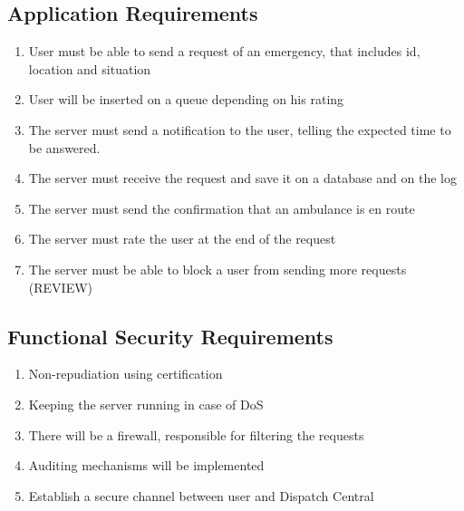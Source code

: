 \documentclass[a4paper,titlepage,11pt]{article}
\begin{document}
	\subsection{Application Requirements}
		\begin{enumerate}
			\item User must be able to send a request of an emergency, that includes id, location and situation

			\item User will be inserted on a queue depending on his rating
			
			\item The server must send a notification to the user, telling the expected time to be answered. 

			\item The server must receive the request and save it on a database and on the log

			\item The server must send the confirmation that an ambulance is en route 

			\item The server must rate the user at the end of the request

			\item The server must be able to block a user from sending more requests (REVIEW)

			
			

 
		\end{enumerate}

	\subsection{Functional Security Requirements}
		\begin{enumerate}
			\item Non-repudiation using certification
			
			\item Keeping the server running in case of DoS
			
			\item There will be a firewall, responsible for filtering the requests

			\item Auditing mechanisms will be implemented

			\item Establish a secure channel between user and Dispatch Central

		\end{enumerate}
\end{document}
